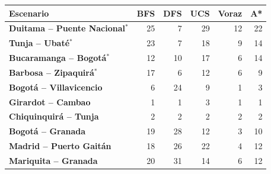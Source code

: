 \renewcommand{\arraystretch}{1.2}
\begin{tabular}{|l|r|r|r|r|r|}
\hline
\rowcolor{gray!20} \textbf{Escenario} & \textbf{BFS} & \textbf{DFS} & \textbf{UCS} & \textbf{Voraz} & \textbf{A*} \\
\hline
\textbf{Duitama -- Puente Nacional$^{*}$} & 25 & 7 & 29 & 12 & 22 \\
\hline
\textbf{Tunja -- Ubaté$^{*}$} & 23 & 7 & 18 & 9 & 14 \\
\hline
\textbf{Bucaramanga -- Bogotá$^{*}$} & 12 & 10 & 17 & 6 & 14 \\
\hline
\textbf{Barbosa -- Zipaquirá$^{*}$} & 17 & 6 & 12 & 6 & 9 \\
\hline
\textbf{Bogotá -- Villavicencio} & 6 & 24 & 9 & 1 & 3 \\
\hline
\textbf{Girardot -- Cambao} & 1 & 1 & 3 & 1 & 1 \\
\hline
\textbf{Chiquinquirá -- Tunja} & 2 & 2 & 2 & 2 & 2 \\
\hline
\textbf{Bogotá -- Granada} & 19 & 28 & 12 & 3 & 10 \\
\hline
\textbf{Madrid -- Puerto Gaitán} & 18 & 26 & 22 & 4 & 12 \\
\hline
\textbf{Mariquita -- Granada} & 20 & 31 & 14 & 6 & 12 \\
\hline
\end{tabular}

